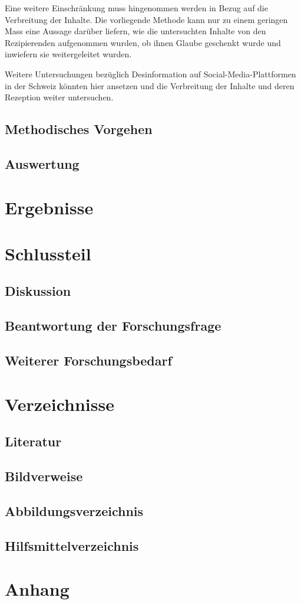 \documentclass[12pt,a4paper]{article}        %
\begin{document}
Eine weitere Einschränkung muss hingenommen werden in Bezug auf die Verbreitung der Inhalte. Die vorliegende Methode kann nur zu einem geringen Mass eine Aussage darüber liefern, wie die untersuchten Inhalte von den Rezipierenden aufgenommen wurden, ob ihnen Glaube geschenkt wurde und inwiefern sie weitergeleitet wurden.

Weitere Untersuchungen bezüglich Desinformation auf Social-Media-Plattformen in der Schweiz könnten hier ansetzen und die Verbreitung der Inhalte und deren Rezeption weiter untersuchen.
\subsection{Methodisches Vorgehen}
\subsection{Auswertung}
\pagebreak
\section{Ergebnisse}
\pagebreak
\section{Schlussteil}
\subsection{Diskussion}
\subsection{Beantwortung der Forschungsfrage}
\subsection{Weiterer Forschungsbedarf}

\pagebreak
\section{Verzeichnisse}
\subsection{Literatur}
\printbibliography[heading=none, nottype=artwork]
\subsection{Bildverweise}
\printbibliography[heading=none, type=artwork] %
\subsection{Abbildungsverzeichnis}
\listoffigures[heading=none]
\subsection{Hilfsmittelverzeichnis}

\section{Anhang}
\end{document}
